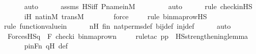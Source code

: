 \begin{isabellebody}
\ \ \ \ \isamarkupfalse%
\ auto{\isacharbrackleft}{\kern0pt}{}{\isacharbrackright}{\kern0pt}\isanewline
\ \ \ \ \isamarkupfalse%
\ assms\ HS{\isacharunderscore}{\kern0pt}iff\ P{\isacharunderscore}{\kern0pt}name{\isacharunderscore}{\kern0pt}in{\isacharunderscore}{\kern0pt}M\ \isanewline
\ \ \ \ \ \ \isamarkupfalse%
\ auto{\isacharbrackleft}{\kern0pt}{}{\isacharbrackright}{\kern0pt}\isanewline
\ \ \ \ \ \isamarkupfalse%
{\isacharparenleft}{\kern0pt}rule\ check{\isacharunderscore}{\kern0pt}in{\isacharunderscore}{\kern0pt}HS{\isacharparenright}{\kern0pt}\isanewline
\ \ \ \ \isamarkupfalse%
\ iH\ nat{\isacharunderscore}{\kern0pt}in{\isacharunderscore}{\kern0pt}M\ transM\ \isanewline
\ \ \ \ \ \isamarkupfalse%
\ force\isanewline
\ \ \ \ \isamarkupfalse%
{\isacharparenleft}{\kern0pt}rule\ binmap{\isacharunderscore}{\kern0pt}row{\isacharprime}{\kern0pt}{\isacharunderscore}{\kern0pt}HS{\isacharparenright}{\kern0pt}\isanewline
\ \ \ \ \isamarkupfalse%
{\isacharparenleft}{\kern0pt}rule\ function{\isacharunderscore}{\kern0pt}value{\isacharunderscore}{\kern0pt}in{\isacharparenright}{\kern0pt}\isanewline
\ \ \ \ \isamarkupfalse%
\ nH\ fin\ nat{\isacharunderscore}{\kern0pt}perms{\isacharunderscore}{\kern0pt}def\ bij{\isacharunderscore}{\kern0pt}def\ inj{\isacharunderscore}{\kern0pt}def\isanewline
\ \ \ \ \isamarkupfalse%
\ auto\isanewline
\isanewline
\ \ \isamarkupfalse%
\ {\isachardoublequoteopen}ForcesHS{\isacharparenleft}{\kern0pt}q{\isacharcomma}{\kern0pt}\ {\isasymphi}{\isacharcomma}{\kern0pt}\ {\isacharbrackleft}{\kern0pt}F{\isacharprime}{\kern0pt}{\isacharcomma}{\kern0pt}\ check{\isacharparenleft}{\kern0pt}i{\isacharparenright}{\kern0pt}{\isacharcomma}{\kern0pt}\ binmap{\isacharunderscore}{\kern0pt}row{\isacharprime}{\kern0pt}{\isacharparenleft}{\kern0pt}n{\isacharparenright}{\kern0pt}{\isacharbrackright}{\kern0pt}{\isacharparenright}{\kern0pt}{\isachardoublequoteclose}\isanewline
\ \ \ \ \isamarkupfalse%
{\isacharparenleft}{\kern0pt}rule{\isacharunderscore}{\kern0pt}tac\ p{\isacharequal}{\kern0pt}{\isachardoublequoteopen}p{\isachardoublequoteclose}\ \ HS{\isacharunderscore}{\kern0pt}strengthening{\isacharunderscore}{\kern0pt}lemma{\isacharparenright}{\kern0pt}\isanewline
\ \ \ \ \isamarkupfalse%
\ pinFn\ qH\ {\isasymphi}{\isacharunderscore}{\kern0pt}def\ \isanewline
\ \ \ \ \ \ \ \ \ \ \isamarkupfalse%

\end{isabellebody}

